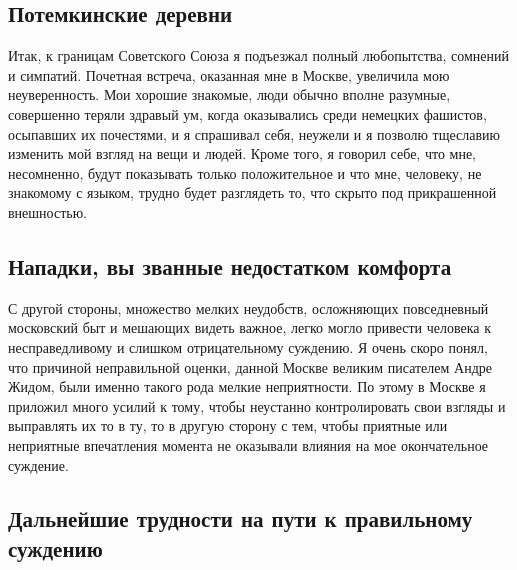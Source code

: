 \documentclass[12pt, a4paper, openany]{book}
\begin{document}
\subsection*{Потемкинские деревни}
Итак,  к границам  Советского Союза  я  подъезжал полный любопытства, сомнений и  симпатий.  Почетная встреча, оказанная мне в Москве, увеличила  мою неуверенность.  Мои  хорошие  знакомые,  люди  обычно вполне  разумные, совершенно  теряли здравый  ум,  когда  оказывались  среди немецких фашистов, осыпавших их почестями, и я спрашивал  себя, неужели и  я позволю тщеславию изменить мой взгляд на вещи и людей. Кроме того, я говорил себе, что мне, несомненно, будут показывать  только положительное и что мне, человеку, не знакомому  с языком, трудно будет разглядеть то, что скрыто под прикрашенной внешностью.

\subsection*{Нападки, вы званные  недостатком  комфорта}
     
С другой стороны, множество мелких неудобств, осложняющих повседневный московский быт  и мешающих видеть важное,  легко   могло   привести  человека  к  несправедливому  и   слишком отрицательному  суждению.  Я  очень  скоро понял,  что причиной неправильной оценки, данной Москве великим писателем Андре Жидом, были именно такого рода мелкие неприятности. По этому в Москве я приложил много усилий к тому, чтобы неустанно контролировать  свои взгляды и выправлять их то в  ту, то в другую сторону  с  тем,  чтобы  приятные  или  неприятные  впечатления  момента  не оказывали влияния на мое окончательное суждение.


\subsection*{Дальнейшие  трудности на пути к правильному суждению}
\end{document}
